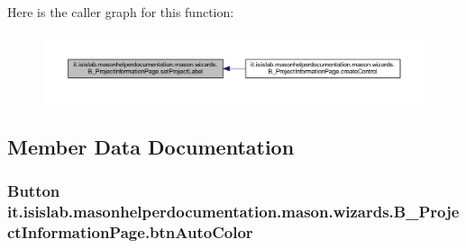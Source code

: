 Here is the caller graph for this function\-:
\nopagebreak
\begin{figure}[H]
\begin{center}
\leavevmode
\includegraphics[width=350pt]{classit_1_1isislab_1_1masonhelperdocumentation_1_1mason_1_1wizards_1_1_b___project_information_page_afa7497cd5a5b4b3c5fb7f7f1397ebb72_icgraph}
\end{center}
\end{figure}




\subsection{Member Data Documentation}
\hypertarget{classit_1_1isislab_1_1masonhelperdocumentation_1_1mason_1_1wizards_1_1_b___project_information_page_a60a4bbca5d0ee37acbc02b31f69db1bd}{
\subsubsection[{btn\-Auto\-Color}]{\setlength{\rightskip}{0pt plus 5cm}Button it.\-isislab.\-masonhelperdocumentation.\-mason.\-wizards.\-B\-\_\-\-Project\-Information\-Page.\-btn\-Auto\-Color\hspace{0.3cm}{\ttfamily [private]}}}\label{classit_1_1isislab_1_1masonhelperdocumentation_1_1mason_1_1wizards_1_1_b___project_information_page_a60a4bbca5d0ee37acbc02b31f69db1bd}

